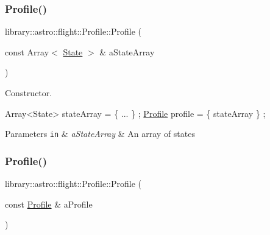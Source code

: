 \subsubsection{\texorpdfstring{Profile()}{Profile()}\hspace{0.1cm}{\footnotesize\ttfamily [2/3]}}
{\footnotesize\ttfamily library\+::astro\+::flight\+::\+Profile\+::\+Profile (\begin{DoxyParamCaption}\item[{const Array$<$ \hyperlink{classlibrary_1_1astro_1_1flight_1_1profile_1_1_state}{State} $>$ \&}]{a\+State\+Array }\end{DoxyParamCaption})}



Constructor. 


\begin{DoxyCode}
Array<State> stateArray = \{ ... \} ;
\hyperlink{classlibrary_1_1astro_1_1flight_1_1_profile_a34d66fdddf3eda9a3fed036d6b9a4363}{Profile} profile = \{ stateArray \} ;
\end{DoxyCode}



\begin{DoxyParams}[1]{Parameters}
\mbox{\tt in}  & {\em a\+State\+Array} & An array of states \\
\hline
\end{DoxyParams}
\mbox{\label{classlibrary_1_1astro_1_1flight_1_1_profile_af728f8d49bdc8355fb94698e29d87781}} 
\subsubsection{\texorpdfstring{Profile()}{Profile()}\hspace{0.1cm}{\footnotesize\ttfamily [3/3]}}
{\footnotesize\ttfamily library\+::astro\+::flight\+::\+Profile\+::\+Profile (\begin{DoxyParamCaption}\item[{const \hyperlink{classlibrary_1_1astro_1_1flight_1_1_profile}{Profile} \&}]{a\+Profile }\end{DoxyParamCaption})\hspace{0.3cm}{\ttfamily [default]}}



